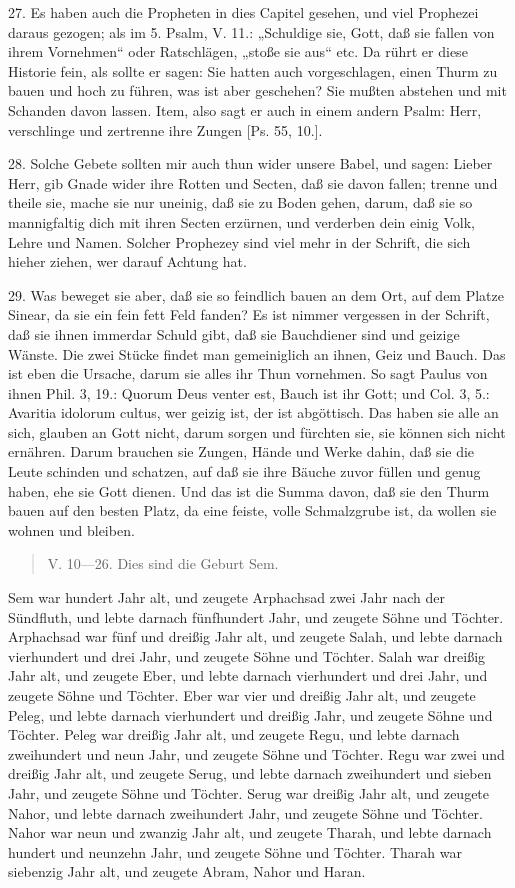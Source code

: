 27. Es haben auch die Propheten in dies Capitel gesehen, und viel Prophezei daraus gezogen; als im 5. Psalm, V. 11.: „Schuldige sie, Gott, daß sie fallen von ihrem Vornehmen“ oder Ratschlägen, „stoße sie aus“ etc. Da rührt er diese Historie fein, als sollte er sagen: Sie hatten auch vorgeschlagen, einen Thurm zu bauen und hoch zu führen, was ist aber geschehen?
Sie mußten abstehen und mit Schanden davon lassen. Item, also sagt er auch in einem andern Psalm: Herr, verschlinge und zertrenne ihre Zungen [Ps. 55, 10.].

28. Solche Gebete sollten mir auch thun wider unsere Babel, und sagen: Lieber Herr, gib Gnade wider ihre Rotten und Secten, daß sie davon fallen; trenne und theile sie, mache sie nur uneinig, daß sie zu Boden gehen, darum, daß sie so mannigfaltig dich mit ihren Secten erzürnen, und verderben dein einig Volk, Lehre und Namen. Solcher Prophezey sind viel mehr in der Schrift, die sich hieher ziehen, wer darauf Achtung hat.

29. Was beweget sie aber, daß sie so feindlich bauen an dem Ort, auf dem Platze Sinear, da sie ein fein fett Feld fanden? Es ist nimmer vergessen in der Schrift, daß sie ihnen immerdar Schuld gibt, daß sie Bauchdiener sind und geizige Wänste. Die zwei Stücke findet man gemeiniglich an ihnen, Geiz und Bauch. Das ist eben die Ursache, darum sie alles ihr Thun vornehmen. So sagt Paulus von ihnen Phil. 3, 19.: Quorum Deus venter est, Bauch ist ihr Gott; und Col. 3, 5.: Avaritia idolorum cultus, wer geizig ist, der ist abgöttisch. Das haben sie alle an sich, glauben an Gott nicht, darum sorgen und fürchten sie, sie können sich nicht ernähren. Darum brauchen sie Zungen, Hände und Werke dahin, daß sie die Leute schinden und schatzen, auf daß sie ihre Bäuche zuvor füllen und genug haben, ehe sie Gott dienen. Und das ist die Summa davon, daß sie den Thurm bauen auf den besten Platz, da eine feiste, volle Schmalzgrube ist, da wollen sie wohnen und bleiben.

\begin{quote}
V. 10—26. Dies sind die Geburt Sem.
\end{quote}

Sem war hundert Jahr alt, und zeugete Arphachsad zwei Jahr nach der Sündfluth, und lebte darnach fünfhundert Jahr, und zeugete Söhne und Töchter. Arphachsad war fünf und dreißig Jahr alt, und zeugete Salah, und lebte darnach vierhundert und drei Jahr, und zeugete Söhne und Töchter. Salah war dreißig Jahr alt, und zeugete Eber, und lebte darnach vierhundert und drei Jahr, und zeugete Söhne und Töchter. Eber war vier und dreißig Jahr alt, und zeugete Peleg, und lebte darnach vierhundert und dreißig Jahr, und zeugete Söhne und Töchter. Peleg war dreißig Jahr alt, und zeugete Regu, und lebte darnach zweihundert und neun Jahr, und zeugete Söhne und Töchter. Regu war zwei und dreißig Jahr alt, und zeugete Serug, und lebte darnach zweihundert und sieben Jahr, und zeugete Söhne und Töchter. Serug war dreißig Jahr alt, und zeugete Nahor, und lebte darnach zweihundert Jahr, und zeugete Söhne und Töchter. Nahor war neun und zwanzig Jahr alt, und zeugete Tharah, und lebte darnach hundert und neunzehn Jahr, und zeugete Söhne und Töchter. Tharah war siebenzig Jahr alt, und zeugete Abram, Nahor und Haran.

